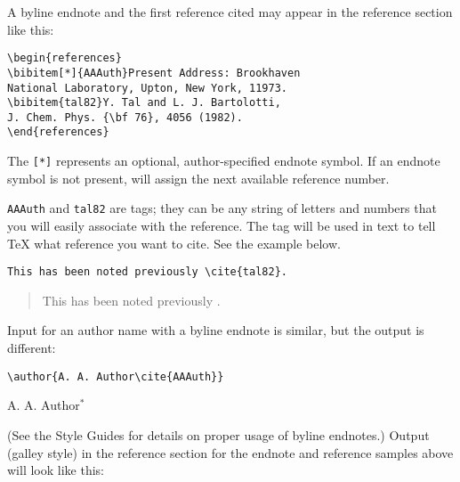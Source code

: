 A byline endnote and the first reference cited may  appear in the reference
section like this:

\smallskip

\begin{verbatim}
\begin{references}
\bibitem[*]{AAAuth}Present Address: Brookhaven
National Laboratory, Upton, New York, 11973.
\bibitem{tal82}Y. Tal and L. J. Bartolotti,
J. Chem. Phys. {\bf 76}, 4056 (1982).
\end{references}
\end{verbatim}

\smallskip

The \verb+[*]+ represents an optional, author-specified endnote symbol. If
an endnote symbol is not present, \REVTeX{} will assign the next available
reference number.

\verb+AAAuth+ and \verb+tal82+ are tags; they can be any string of letters
and numbers that you will easily associate with the reference.  The tag
will be used in text to tell \TeX{} what reference you want to cite. See
the example below.

\bigskip

\nocite{AAAuth}

\begin{verbatim}
This has been noted previously \cite{tal82}.
\end{verbatim}
\begin{quote}
This has been noted previously \cite{tal82}.
\end{quote}
\smallskip
Input for an author name with a byline endnote
is similar, but the output is different:

\bigskip

\begin{verbatim}
\author{A. A. Author\cite{AAAuth}}
\end{verbatim}
\bigskip
\begin{center} %
A. A. Author$^{*}$
\end{center}

\bigskip

(See the Style Guides for details on proper usage of byline endnotes.) Output
(galley style) in the reference section for the endnote and reference
samples above will look like this:


